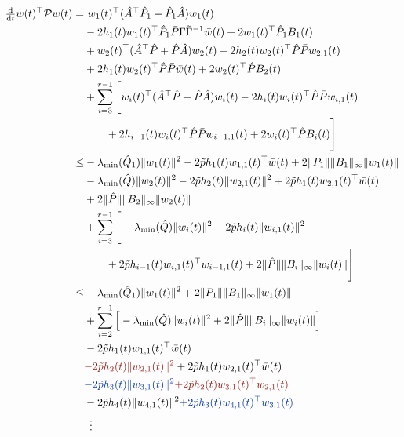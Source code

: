 \documentclass[ envcountsect, envcountsame]{svjour3}
\newcommand{\ddt}{\tfrac{\text{\normalfont d}}{\text{\normalfont d}t}}
\newcommand{\cP}{\mathcal{P}}
\def\red#1{\textcolor[rgb]{0.60,0.10,0.07}{#1}}
\def\blue#1{\textcolor[rgb]{0.00,0.20,0.70}{#1}}
\begin{document}
\begin{equation} \label{eq:Lyapunov}
\begin{aligned}
\ddt w(t)^\top \cP w(t) =& \
w_1(t)^\top (\hat A^\top \hat P_1 + \hat P_1 \hat A)  w_1(t) \\
& - 2 h_1(t) w_{1}(t)^\top \hat P_1 \bar P \Gamma \tilde \Gamma^{-1} \bar w(t) + 2 w_1(t)^\top \hat P_1 B_1(t) \\
&+ w_2(t)^\top (\hat A^\top \hat P + \hat P \hat A) w_2(t) - 2 h_2(t) w_2(t)^\top \hat P \bar P w_{2,1}(t) \\
& + 2 h_1(t) w_{2}(t)^\top \hat P \bar P \bar w(t) + 2 w_2(t)^\top \hat P B_2(t) \\
& + \sum_{i=3}^{r-1} \Bigg[ w_i(t)^\top (\hat A^\top \hat P + \hat P \hat A) w_i(t) - 2 h_i(t) w_i(t)^\top \hat P \bar P w_{i,1}(t) \\
& \qquad + 2 h_{i-1}(t) w_i(t)^\top \hat P \bar P w_{i-1,1}(t) + 2 w_i(t)^\top \hat P B_i(t) \Bigg] \\
%
\le & - \lambda_{\rm min}(\hat Q_1) \|w_1(t)\|^2 - 2 \tilde p h_{1}(t) w_{1,1}(t)^\top \bar w(t)  + 2 \|P_1\| \|B_1\|_\infty \|w_1(t) \| \\
& - \lambda_{\rm min}(\hat Q) \|w_{2}(t)\|^2 - 2\tilde p h_2(t) \|w_{2,1}(t)\|^2 + 2 \tilde p h_1(t) w_{2,1}(t)^\top \bar w(t) \\
&+ 2 \|\hat P\| \|B_2\|_\infty \|w_2(t)\|  \\
& + \sum_{i=3}^{r-1} \Bigg[- \lambda_{\rm min}(\hat Q) \|w_i(t)\|^2  - 2\tilde p h_i(t) \|w_{i,1}(t)\|^2 \\
& \qquad + 2 \tilde p h_{i-1}(t) w_{i,1}(t)^\top w_{i-1,1}(t) + 2 \|\hat P\| \|B_i\|_\infty \|w_i(t)\| \Bigg] \\
%
\le &- \lambda_{\rm min}(\hat Q_1) \|w_1(t)\|^2 + 2 \|P_1\| \|B_1\|_\infty \|w_1(t) \| \\
& + \sum_{i=2}^{r-1} \Big[ - \lambda_{\rm min}(\hat Q)\|w_i(t)\|^2 + 2 \|\hat P\| \|B_i\|_\infty \|w_i(t)\| \Big] \\
& - 2 \tilde p h_{1}(t) w_{1,1}(t)^\top \bar w(t) \\
& \red{{- 2 \tilde p h_2(t) \|w_{2,1}(t)\|^2 }} + 2 \tilde p h_1(t) w_{2,1}(t)^\top \bar w(t) \\
& \blue{{- 2 \tilde p h_3(t) \|w_{3,1}(t)\|^2}} \red{{+ 2 \tilde p h_2(t) w_{3,1}(t)^\top w_{2,1}(t)}} \\
& - 2 \tilde p h_4(t) \|w_{4,1}(t)\|^2  \blue{{+ 2 \tilde p h_3(t) w_{4,1}(t)^\top w_{3,1}(t)}} \\
& \ \, \vdots \\

\end{aligned}
\end{equation}
\end{document}
